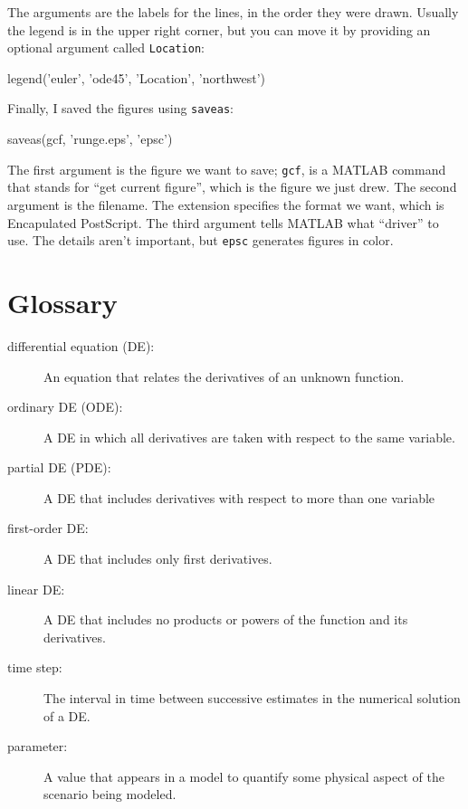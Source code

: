 \documentclass[
]{book}
\numberwithin{Answer}{chapter}
\numberwithin{Exercise}{chapter}
\begin{document}
The arguments are the labels for the lines, in the order they were drawn.  Usually the legend is in the upper right corner, but you can move it by providing an optional argument called {\tt Location}:

\begin{code}
legend('euler', 'ode45', 'Location', 'northwest')
\end{code}

Finally, I saved the figures using {\tt saveas}:

\begin{code}
saveas(gcf, 'runge.eps', 'epsc')
\end{code}

The first argument is the figure we want to save; {\tt gcf}, is a MATLAB command that stands for ``get current figure'', which is the figure we just drew.  The second argument is the filename.  The extension specifies the format we want, which is Encapulated PostScript.  The third argument tells MATLAB what ``driver'' to use.  The details aren't important, but {\tt epsc} generates figures in color.




\section{Glossary}

\begin{description}

\item[differential equation (DE):] An equation that relates the
derivatives of an unknown function.

\item[ordinary DE (ODE):] A DE in which all derivatives are taken with
respect to the same variable.

\item[partial DE (PDE):] A DE that includes derivatives with respect to
more than one variable

\item[first-order DE:] A DE that includes only first derivatives.

\item[linear DE:] A DE that includes no products or powers of the
function and its derivatives.

\item[time step:] The interval in time between successive estimates
in the numerical solution of a DE.

\item[parameter:] A value that appears in a model to quantify some
physical aspect of the scenario being modeled.

\end{description}
\end{document}
